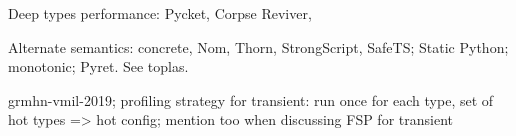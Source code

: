 

Deep types performance: Pycket, Corpse Reviver,

Alternate semantics: concrete, Nom, Thorn, StrongScript, SafeTS;
Static Python; monotonic; Pyret. See toplas.

grmhn-vmil-2019;
profiling strategy for transient: run once for each type, set of hot types => hot config;
mention too when discussing FSP for transient


